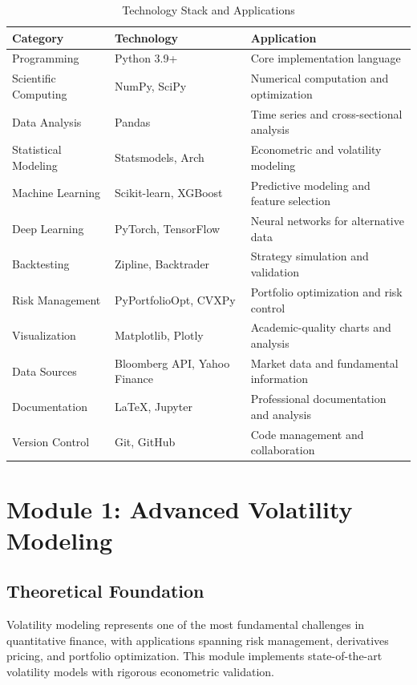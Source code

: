 \documentclass[12pt,a4paper]{article}
\begin{document}
\begin{table}[H]
\centering
\caption{Technology Stack and Applications}
\begin{tabular}{@{}lll@{}}
\toprule
\textbf{Category} & \textbf{Technology} & \textbf{Application} \\
\midrule
Programming & Python 3.9+ & Core implementation language \\
Scientific Computing & NumPy, SciPy & Numerical computation and optimization \\
Data Analysis & Pandas & Time series and cross-sectional analysis \\
Statistical Modeling & Statsmodels, Arch & Econometric and volatility modeling \\
Machine Learning & Scikit-learn, XGBoost & Predictive modeling and feature selection \\
Deep Learning & PyTorch, TensorFlow & Neural networks for alternative data \\
Backtesting & Zipline, Backtrader & Strategy simulation and validation \\
Risk Management & PyPortfolioOpt, CVXPy & Portfolio optimization and risk control \\
Visualization & Matplotlib, Plotly & Academic-quality charts and analysis \\
Data Sources & Bloomberg API, Yahoo Finance & Market data and fundamental information \\
Documentation & \LaTeX, Jupyter & Professional documentation and analysis \\
Version Control & Git, GitHub & Code management and collaboration \\
\bottomrule
\end{tabular}
\end{table}

\section{Module 1: Advanced Volatility Modeling}

\subsection{Theoretical Foundation}

Volatility modeling represents one of the most fundamental challenges in quantitative finance, with applications spanning risk management, derivatives pricing, and portfolio optimization. This module implements state-of-the-art volatility models with rigorous econometric validation.
\end{document}
